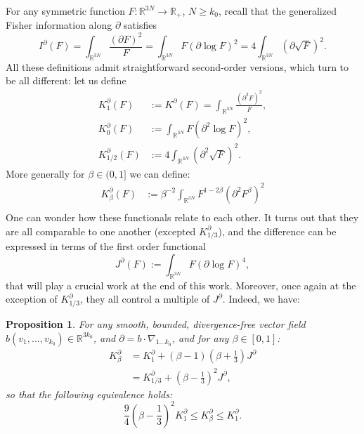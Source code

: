 \documentclass[11pt,a4paper]{article}
\theoremstyle{definition}
\theoremstyle{plain}
\newtheorem{prop}[defi]{Proposition}
\begin{document}
For any symmetric function $F:\mathbb{R}^{3N}\rightarrow \mathbb{R}_+$, $N\geq k_0$, recall that the generalized Fisher information along $\partial$ satisfies
$$I^\partial(F)=\int_{\mathbb{R}^{3N}} \frac{( \partial F)^2}{F} =\int_{\mathbb{R}^{3N}} F( \partial \log F)^2 =4\int_{\mathbb{R}^{3N}} ( \partial \sqrt{F})^2.$$
All these definitions admit straightforward second-order versions, which turn to be all different: let us define
\begin{align*}
    K^\partial_1(F)&:=K^\partial(F)=\int_{\mathbb{R}^{3N}}\! \frac{( \partial^2 F)^2}{F},\\
    K^\partial_{0}(F)&:=\int_{\mathbb{R}^{3N}}\! F( \partial^2 \log F)^2,\\
    K^\partial_{1/2}(F)&:=4\int_{\mathbb{R}^{3N}}\! ( \partial^2 \sqrt{F})^2.
\end{align*}
More generally for $\beta\in(0,1]$ we can define:
\begin{align*}
    K^\partial_{\beta}(F)&:=\beta^{-2}\int_{\mathbb{R}^{3N}} F^{1-2\beta}(\partial^2 F^\beta)^2\\
\end{align*}
One can wonder how these functionals relate to each other. It turns out that they are all comparable to one another (excepted $K^\partial_{1/3}$), and the difference can be expressed in terms of the first order functional
\begin{equation}
\label{eq:defJ}
    J^\partial(F):=\int_{\mathbb{R}^{3N}} F( \partial \log F)^4,
\end{equation}
that will play a crucial work at the end of this work. Moreover, once again at the exception of $K^\partial_{1/3}$, they all control a multiple of $J^\partial$.  Indeed, we have:
\begin{prop}
    \label{prop:func_comparison}
    For any smooth, bounded, divergence-free vector field $b(v_1,...,v_{k_0})\in\mathbb{R}^{3k_0}$, and $\partial=b\cdot\nabla_{1...k_0}$, and for any $\beta\in[0,1]$:
    \begin{align*}
    K^\partial_\beta&= K^\partial_1 +(\beta-1)(\beta+\frac{1}{3}) J^\partial\\
    &=K^\partial_{1/3} +(\beta-\frac{1}{3}) ^2J^\partial,
    \end{align*}
    so that the following equivalence holds:
    $$\frac{9}{4}(\beta-\frac{1}{3})^2K^\partial_1 \leq K_\beta^\partial \leq K_1^\partial.$$
\end{prop}
\end{document}
